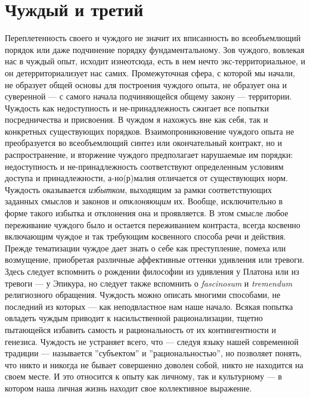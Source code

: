 \documentclass[12pt]{book}
\begin{document}
\section{Чуждый и третий}

Переплетенность своего и чуждого не значит их вписанность во всеобъемлющий порядок или даже подчинение порядку фундаментальному. Зов чуждого, вовлекая нас в чуждый опыт, исходит изнеотсюда, есть в нем нечто экс-территориальное, и он детерриториализует нас самих. Промежуточная сфера, с которой мы начали, не образует общей основы для построения чуждого опыта, не образует она и суверенной --- с самого начала подчиняющейся общему закону --- территории. Чуждость как недоступность и не-принадлежность сжигает все попытки посредничества и присвоения. В чуждом я нахожусь вне как себя, так и конкретных существующих порядков. Взаимопроникновение чуждого опыта не преобразуется во всеобъемлющий синтез или окончательный контракт, но и распространение, и вторжение чуждого предполагает нарушаемые им порядки: недоступность и не-принадлежность соответствуют определенным условиям доступа и принадлежности, а-но(р)малия отличается от существующих норм. Чуждость оказывается \textit{избытком}, выходящим за рамки соответствующих заданных смыслов и законов и \textit{отклоняющим} их. Вообще, исключительно в форме такого избытка и отклонения она и проявляется. В этом смысле любое переживание чуждого было и остается переживанием контраста, всегда косвенно включающим чуждое и так требующим косвенного способа речи и действия. Прежде тематизации чуждое дает знать о себе как преступление, помеха или возмущение, приобретая различные аффективные оттенки удивления или тревоги. Здесь следует вспомнить о рождении философии из удивления у Платона или из тревоги --- у Эпикура, но следует также вспомнить о \textit{fascinosum} и \textit{tremendum} религиозного обращения. Чуждость можно описать многими способами, не последний из которых --- как неподвластное нам наше начало. Всякая попытка овладеть чуждым приводит к насильственной рационализации, тщетно пытающейся избавить самость и рациональность от их контингентности и генезиса. Чуждость не устраняет всего, что --- следуя языку нашей современной традиции --- называется ''субъектом'' и ''рациональностью'', но позволяет понять, что никто и никогда не бывает совершенно доволен собой, никто не находится на своем месте. И это относится к опыту как личному, так и культурному --- в котором наша личная жизнь находит свое коллективное выражение.
\end{document}
